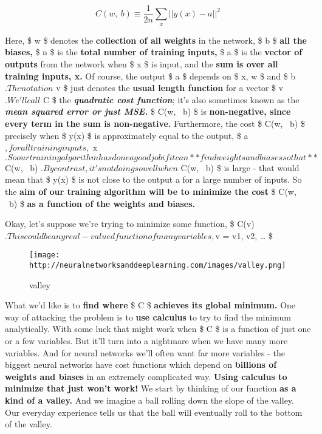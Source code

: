 \documentclass[]{article}
\begin{document}
\begin{equation}
    C(w, \ b)\equiv\frac{1}{2n}\sum_x ||y(x) − a||^2
\end{equation}

Here, \$ w \$ denotes the \textbf{collection of all weights} in the
network, \$ b \$ \textbf{all the biases,} \$ n \$ is the \textbf{total
number of training inputs,} \$ a \$ is the \textbf{vector of outputs}
from the network when \$ x \$ is input, and the \textbf{sum is over all
training inputs, x.} Of course, the output \$ a \$ depends on \$ x, w \$
and \$ b $. The notation $ \textbar{}\textbar{}v\textbar{}\textbar{} \$
just denotes the \textbf{usual length function} for a vector \$ v
$. We'll call $ C \$ the \textbf{\emph{quadratic cost function}}; it's
also sometimes known as the \textbf{\emph{mean squared error or just
MSE.}} \$ C(w, ~b) \$ is \textbf{non-negative, since every term in the
sum is non-negative.} Furthermore, the cost \$ C(w, ~b) \$ precisely
when \$ y(x) \$ is approximately equal to the output, \$ a
$, for all training inputs, $ x
$. So our training algorithm has done a good job if it can **find weights and biases so that** $
C(w, ~b)  $. By contrast, it's not doing so well when $ C(w,
~b) \$ is large - that would mean that \$ y(x) \$ is not close to the
output a for a large number of inputs. So the \textbf{aim of our
training algorithm will be to minimize the cost} \$ C(w, ~b) \$
\textbf{as a function of the weights and biases.}

Okay, let's suppose we're trying to minimize some function, \$ C(v)
$. This could be any real-valued function of many variables, $v = v1,
v2, \ldots{} \$

\begin{figure}[htbp]
\centering
\texttt{[image: http://neuralnetworksanddeeplearning.com/images/valley.png]}
\caption{valley}
\end{figure}

What we'd like is to \textbf{find where} \$ C \$ \textbf{achieves its
global minimum.} One way of attacking the problem is to \textbf{use
calculus} to try to find the minimum analytically. With some luck that
might work when \$ C \$ is a function of just one or a few variables.
But it'll turn into a nightmare when we have many more variables. And
for neural networks we'll often want far more variables - the biggest
neural networks have cost functions which depend on \textbf{billions of
weights and biases} in an extremely complicated way. \textbf{Using
calculus to minimize that just won't work!} We start by thinking of our
function \textbf{as a kind of a valley.} And we imagine a ball rolling
down the slope of the valley. Our everyday experience tells us that the
ball will eventually roll to the bottom of the valley.
\end{document}
